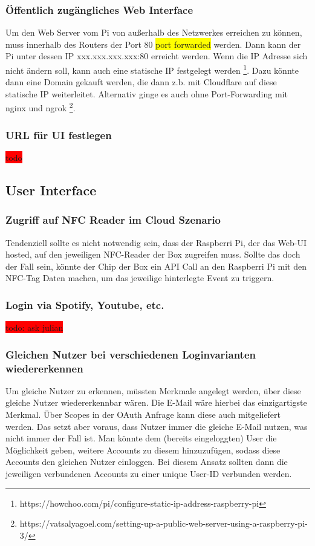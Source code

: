 \documentclass[10pt, a4paper, draft]{article}
\begin{document}
\subsubsection{Öffentlich zugängliches Web Interface}
Um den Web Server vom Pi von außerhalb des Netzwerkes erreichen zu können, muss innerhalb des Routers der Port 80 \colorbox{yellow}{port forwarded} werden.
Dann kann der Pi unter dessen IP xxx.xxx.xxx.xxx:80 erreicht werden.
Wenn die IP Adresse sich nicht ändern soll, kann auch eine statische IP festgelegt werden \footnote{https://howchoo.com/pi/configure-static-ip-address-raspberry-pi}. Dazu könnte dann eine Domain gekauft werden, die dann z.b. mit Cloudflare auf diese statische IP weiterleitet.
Alternativ ginge es auch ohne Port-Forwarding mit nginx und ngrok \footnote{https://vatsalyagoel.com/setting-up-a-public-web-server-using-a-raspberry-pi-3/}.

\subsubsection{URL für UI festlegen}
\colorbox{red}{todo}

\subsection{User Interface}
\subsubsection{Zugriff auf NFC Reader im Cloud Szenario}
Tendenziell sollte es nicht notwendig sein, dass der Raspberri Pi, der das Web-UI hosted, auf den jeweiligen NFC-Reader der Box zugreifen muss.
Sollte das doch der Fall sein, könnte der Chip der Box ein API Call an den Raspberri Pi mit den NFC-Tag Daten machen, um das jeweilige hinterlegte Event zu triggern.

\subsubsection{Login via Spotify, Youtube, etc.}
\colorbox{red}{todo: ask julian}

\subsubsection{Gleichen Nutzer bei verschiedenen Loginvarianten wiedererkennen}
Um gleiche Nutzer zu erkennen, müssten Merkmale angelegt werden, über diese gleiche Nutzer wiedererkennbar wären.
Die E-Mail wäre hierbei das einzigartigste Merkmal. Über Scopes in der OAuth Anfrage kann diese auch mitgeliefert werden.
Das setzt aber voraus, dass Nutzer immer die gleiche E-Mail nutzen, was nicht immer der Fall ist.
Man könnte dem (bereits eingeloggten) User die Möglichkeit geben, weitere Accounts zu diesem hinzuzufügen, sodass diese Accounts den gleichen Nutzer einloggen.
Bei diesem Ansatz sollten dann die jeweiligen verbundenen Accounts zu einer unique User-ID verbunden werden.
\end{document}
